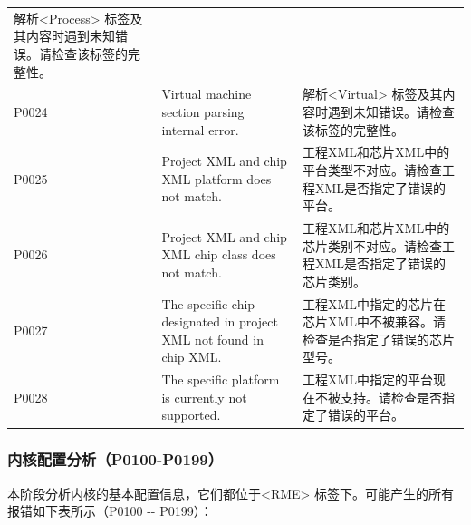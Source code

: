 \begin{xltabular}{\textwidth}{@{}>{\hsize\raggedright\arraybackslash}X>{\hsize\raggedright\arraybackslash}X>{\hsize\raggedright\arraybackslash}X@{}}
解析<Process> 标签及其内容时遇到未知错误。请检查该标签的完整性。\tabularnewline
P0024 & Virtual machine section parsing internal error. &
解析<Virtual> 标签及其内容时遇到未知错误。请检查该标签的完整性。\tabularnewline
P0025 & Project XML and chip XML platform does not match. &
工程XML和芯片XML中的平台类型不对应。请检查工程XML是否指定了错误的平台。\tabularnewline
P0026 & Project XML and chip XML chip class does not match. &
工程XML和芯片XML中的芯片类别不对应。请检查工程XML是否指定了错误的芯片类别。\tabularnewline
P0027 & The specific chip designated in project XML not found in chip
XML. &
工程XML中指定的芯片在芯片XML中不被兼容。请检查是否指定了错误的芯片型号。\tabularnewline
P0028 & The specific platform is currently not supported. &
工程XML中指定的平台现在不被支持。请检查是否指定了错误的平台。\tabularnewline
\end{xltabular}

\newpage
{}
\subsubsection{内核配置分析（P0100-P0199）}\label{subsubsec:5-6-2-2}

本阶段分析内核的基本配置信息，它们都位于<RME> 标签下。可能产生的所有报错如下表所示（P0100
-\/- P0199）：

